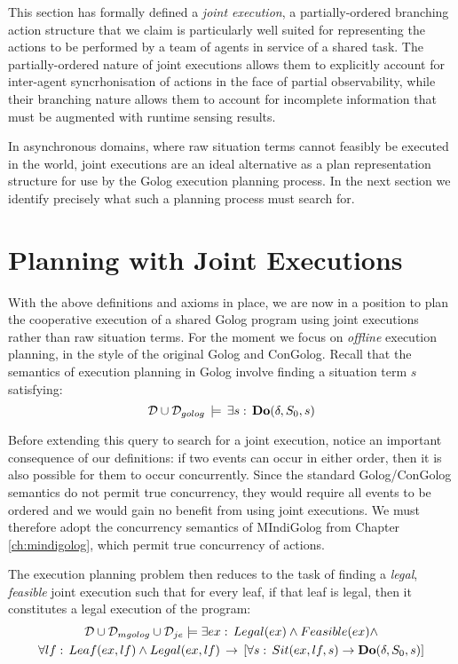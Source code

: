 This section has formally defined a \emph{joint execution}, a partially-ordered
branching action structure that we claim is particularly well suited
for representing the actions to be performed by a team of agents in
service of a shared task. The partially-ordered nature of joint executions
allows them to explicitly account for inter-agent syncrhonisation
of actions in the face of partial observability, while their branching
nature allows them to account for incomplete information that must
be augmented with runtime sensing results.

In asynchronous domains, where raw situation terms cannot feasibly
be executed in the world, joint executions are an ideal alternative
as a plan representation structure for use by the Golog execution
planning process. In the next section we identify precisely what such
a planning process must search for.


\section{Planning with Joint Executions\label{sec:JointExec:Planning}}

With the above definitions and axioms in place, we are now in a position
to plan the cooperative execution of a shared Golog program using
joint executions rather than raw situation terms. For the moment we
focus on \emph{offline} execution planning, in the style of the original
Golog and ConGolog. Recall that the semantics of execution planning
in Golog involve finding a situation term $s$ satisfying:\[
\mathcal{D}\cup\mathcal{D}_{golog}\,\models\,\exists s:\,\mathbf{Do}(\delta,S_{0},s)\]


Before extending this query to search for a joint execution, notice
an important consequence of our definitions: if two events can occur
in either order, then it is also possible for them to occur concurrently.
Since the standard Golog/ConGolog semantics do not permit true concurrency,
they would require all events to be ordered and we would gain no benefit
from using joint executions. We must therefore adopt the concurrency
semantics of MIndiGolog from Chapter \ref{ch:mindigolog}, which permit
true concurrency of actions.

The execution planning problem then reduces to the task of finding
a \emph{legal}, \emph{feasible} joint execution such that for every
leaf, if that leaf is legal, then it constitutes a legal execution
of the program:\begin{multline*}
\mathcal{D}\cup\mathcal{D}_{mgolog}\cup\mathcal{D}_{je}\models\exists ex:\, Legal(ex)\wedge Feasible(ex)\wedge\\
\forall lf:\, Leaf(ex,lf)\wedge Legal(ex,lf)\,\rightarrow\,\left[\forall s:\, Sit(ex,lf,s)\rightarrow\mathbf{Do}(\delta,S_{0},s)\right]\end{multline*}



